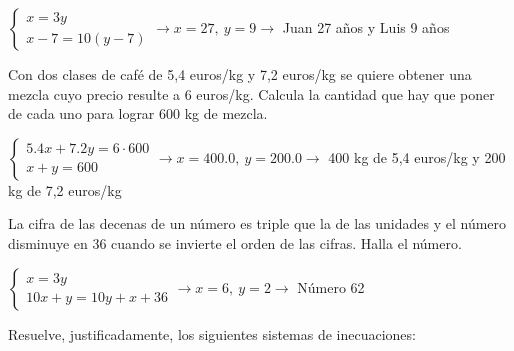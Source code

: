 \documentclass[addpoints,spanish, 12pt,a4paper]{exam}
\begin{document}
\begin{questions}
\begin{parts}
\begin{solution} $\left\{\begin{matrix}x=3y \\ x-7=10(y-7)\end{matrix}\right. \to  x = 27, \  y = 9 \to$ Juan 27 años y Luis 9 años \end{solution}

\end{parts}

\question[1] Con dos clases de café de 5,4 euros/kg y 7,2 euros/kg se quiere obtener una mezcla cuyo precio resulte a 6 euros/kg. Calcula la cantidad que hay que poner de cada uno para lograr 600 kg de mezcla.

\begin{solution} $\left\{\begin{matrix}5.4x+7.2y=6 \cdot 600 \\ x+y=600\end{matrix}\right. \to  x = 400.0, \  y = 200.0 \to$ 400 kg de 5,4 euros/kg y 200 kg de 7,2 euros/kg \end{solution}

\question La cifra de las decenas de un número es triple que la de las unidades y el número disminuye en 36 cuando se invierte el orden de las cifras. Halla el número.
\begin{solution} $\left\{\begin{matrix}x=3y \\ 10x+y=10y+x+36\end{matrix}\right. \to  x = 6, \  y = 2 \to $ Número 62 \end{solution}

\question Resuelve, justificadamente, los siguientes sistemas de inecuaciones:
\end{questions}
\end{document}
